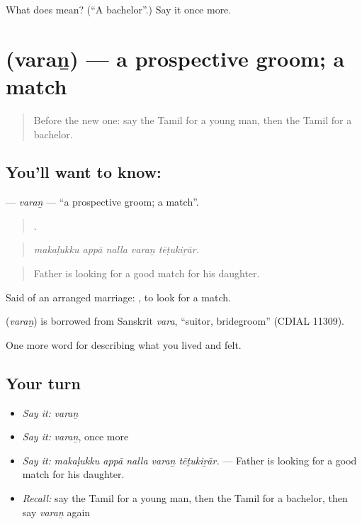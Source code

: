 \begin{tcolorbox}[breakable,colback=teal!4,colframe=teal!35!black,title={Before you move on}]
What does  mean? (\textquotedblleft{}A bachelor\textquotedblright{}.) Say it once more.
\end{tcolorbox}
\section[\texorpdfstring{\ta{வரன்} (varaṉ)}{வரன் (varaṉ)}]{ (varaṉ) — a prospective groom; a match}

\label{lesson:TA-C498-varan}



\begin{quote}
Before the new one: say the Tamil for a young man, then the Tamil for a bachelor.
\end{quote}

\subsection*{You'll want to know: }
\textbf{} — \emph{varaṉ} — \textquotedblleft{}a prospective groom; a match\textquotedblright{}.

\begin{quote}
    .
\end{quote}

\begin{quote}
\emph{makaḷukku appā nalla varaṉ tēṭukiṟār.}
\end{quote}

\begin{quote}
Father is looking for a good match for his daughter.
\end{quote}

Said of an arranged marriage:  , to look for a match.

\begin{cousinweb}
\textbf{} (\emph{varaṉ}) is borrowed from Sanskrit \emph{vara}, \textquotedblleft{}suitor, bridegroom\textquotedblright{} (CDIAL 11309).
\end{cousinweb}

\begin{grammarlens}[title={What you've built}]
One more word for describing what you lived and felt.
\end{grammarlens}

\subsection*{Your turn}
\begin{itemize}
\raggedright
  \item \emph{Say it:} \emph{varaṉ}
  \item \emph{Say it:} \emph{varaṉ}, once more
  \item \emph{Say it:} \emph{makaḷukku appā nalla varaṉ tēṭukiṟār.} — Father is looking for a good match for his daughter.
  \item \emph{Recall:} say the Tamil for a young man, then the Tamil for a bachelor, then say \emph{varaṉ} again
\end{itemize}

